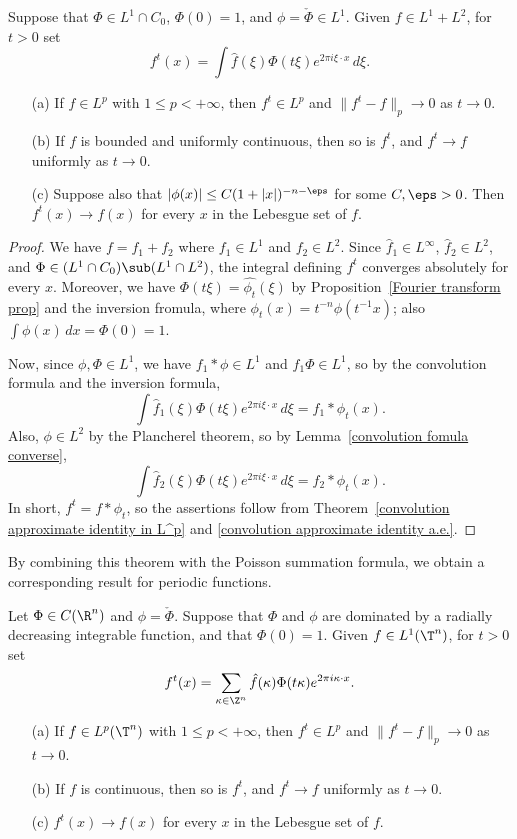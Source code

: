 \begin{theorem}\label{Fourier invert on L^1+L^2}
Suppose that $\Phi\in L^1\cap C_0$, $\Phi(0)=1$, and $\phi=\check{\Phi}\in L^1$. Given $f\in L^1+L^2$, for $t>0$ set
\[f^t(x)=\int\hat{f}(\xi)\Phi(t\xi)e^{2\pi i\xi\cdot x}\,d\xi.\]
\begin{itemize}
\item[(a)] If $f\in L^p$ with $1\leq p<+\infty$, then $f^t\in L^p$ and $\|f^t-f\|_p\to 0$ as $t\to 0$.
\item[(b)] If $f$ is bounded and uniformly continuous, then so is $f^t$, and $f^t\to f$ uniformly as $t\to 0$.
\item[(c)] Suppose also that $|\phi(x)|\leq C(1+|x|)^{-n-\eps}$ for some $C,\eps>0$. Then $f^t(x)\to f(x)$ for every $x$ in the Lebesgue set of $f$.
\end{itemize}
\end{theorem}
\begin{proof}
We have $f=f_1+f_2$ where $f_1\in L^1$ and $f_2\in L^2$. Since $\hat{f}_1\in L^{\infty}$, $\hat{f}_2\in L^2$, and $\Phi\in(L^1\cap C_0)\sub(L^1\cap L^2)$, the integral defining $f^t$ converges absolutely for every $x$. Moreover, we have $\Phi(t\xi)=\widehat{\phi_t}(\xi)$ by Proposition~\ref{Fourier transform prop} and the inversion fromula, where $\phi_t(x)=t^{-n}\phi(t^{-1}x)$; also $\int\phi(x)\,dx=\Phi(0)=1$.\par
Now, since $\phi,\Phi\in L^1$, we have $f_1\ast\phi\in L^1$ and $\widehat{f}_1\Phi\in L^1$, so by the convolution formula and the inversion formula,
\[\int\widehat{f}_1(\xi)\Phi(t\xi)e^{2\pi i\xi\cdot x}\,d\xi=f_1\ast\phi_t(x).\]
Also, $\phi\in L^2$ by the Plancherel theorem, so by Lemma~\ref{convolution fomula converse},
\[\int\widehat{f}_2(\xi)\Phi(t\xi)e^{2\pi i\xi\cdot x}\,d\xi=f_2\ast\phi_t(x).\]
In short, $f^t=f\ast\phi_t$, so the assertions follow from Theorem~\ref{convolution approximate identity in L^p} and \ref{convolution approximate identity a.e.}.
\end{proof}
By combining this theorem with the Poisson summation formula, we obtain a corresponding result for periodic functions.
\begin{theorem}\label{fourier invert on periodic}
Let $\Phi\in C(\R^n)$ and $\phi=\check{\Phi}$. Suppose that $\Phi$ and $\phi$ are dominated by a radially decreasing integrable function, and that $\Phi(0)=1$. Given $f\in L^1(\T^n)$, for $t>0$ set
\[f^t(x)=\sum_{\kappa\in\Z^n}\hat{f}(\kappa)\Phi(t\kappa)e^{2\pi i\kappa\cdot x}.\]
\begin{itemize}
\item[(a)] If $f\in L^p(\T^n)$ with $1\leq p<+\infty$, then $f^t\in L^p$ and $\|f^t-f\|_p\to 0$ as $t\to 0$.
\item[(b)] If $f$ is continuous, then so is $f^t$, and $f^t\to f$ uniformly as $t\to 0$.
\item[(c)] $f^t(x)\to f(x)$ for every $x$ in the Lebesgue set of $f$.
\end{itemize}
\end{theorem}
